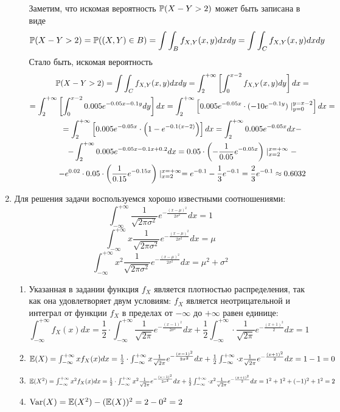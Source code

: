 \documentclass[12pt, a4paper]{article}\usepackage[]{graphicx}\usepackage[]{color}
\begin{document}
\begin{enumerate}
\begin{enumerate}
	Заметим, что искомая вероятность  $\P(X-Y > 2)$ может быть записана в виде
	\[
	\P(X-Y > 2) = \P((X, Y) \in B ) = \int \int_B f_{X, Y} (x, y) dx dy = \int \int_C f_{X, Y} (x, y) dx dy
	\]
	Стало быть, искомая вероятность
	\begin{multline*}
	\P(X-Y > 2) = \int \int_C f_{X, Y} (x, y) dx dy = \int_{2}^{+\infty} \left[ \int_{0}^{x-2} f_{X, Y} (x, y) dy \right] dx =\\
	= \int_{2}^{+\infty} \left[ \int_{0}^{x-2} 0.005e^{-0.05x-0.1y}dy \right] dx
	= \int_{2}^{+\infty} \left[ 0.005e^{-0.05x} \cdot (-10e^{-0.1y}) \mid_{y=0}^{y=x-2} \right] dx = \\
	=  \int_{2}^{+\infty} \left[ 0.005e^{-0.05x} \cdot\left(1-e^{-0.1(x-2)}  \right) \right] dx  = \int_{2}^{+\infty} 0.005e^{-0.05x} dx - \\
	- \int_{2}^{+\infty} 0.005e^{-0.05x-0.1x+0.2} dx
	= 0.05 \cdot \left( -\frac{1}{0.05}e^{-0.05x}  \right) \mid_{x=2}^{x=+\infty} - \\
	- e^{0.02} \cdot 0.05 \cdot \left( \frac{1}{0.15} e^{-0.15x} \right)\mid_{x=2}^{x=+\infty}
	= e^{-0.1} -\frac{1}{3} e^{-0.1} = \frac{2}{3}e^{-0.1}  \approx 0.6032
	\end{multline*}
\end{enumerate}
\item Для решения задачи воспользуемся хорошо известными соотношениями:
\[
\int_{-\infty}^{+\infty} \frac{1}{\sqrt{2\pi\sigma^2}} e^{-\frac{(x-\mu)^2}{2\sigma^2}} dx = 1
\]
\[
\int_{-\infty}^{+\infty} x\frac{1}{\sqrt{2\pi\sigma^2}} e^{-\frac{(x-\mu)^2}{2\sigma^2}} dx = \mu
\]
\[
\int_{-\infty}^{+\infty} x^2 \frac{1}{\sqrt{2\pi\sigma^2}} e^{-\frac{(x-\mu)^2}{2\sigma^2}} dx = \mu^2 + \sigma^2
\]
\begin{enumerate}
	\item Указанная в задании функция $f_X$ является плотностью распределения, так как она удовлетворяет двум условиям:  $f_X$ является неотрицательной и интеграл от функции $f_X$ в пределах от  $-\infty$ до $+\infty$ равен единице:
	\[
	\int_{-\infty}^{+\infty} f_X (x) dx = \frac{1}{2} \cdot \int_{-\infty}^{+\infty}  \frac{1}{\sqrt{2\pi}} e^{-\frac{(x-1)^2}{2\sigma^2}} dx  + \frac{1}{2} \int_{-\infty}^{+\infty} \cdot \frac{1}{\sqrt{2\pi}} e^{-\frac{(x+1)^2}{2}} dx = 1
	\]
	\item $\E(X) =\int_{-\infty}^{+\infty} xf_X (x) dx =  \frac{1}{2} \cdot \int_{-\infty}^{+\infty} x \frac{1}{\sqrt{2\pi}} e^{-\frac{(x-1)^2}{2\sigma^2}} dx  + \frac{1}{2}\int_{-\infty}^{+\infty} \cdot x \frac{1}{\sqrt{2\pi}} e^{-\frac{(x+1)^2}{2}} dx = 1- 1=  0$
	\item $\E(X^2) = \int_{-\infty}^{+\infty} x^2 f_X (x) dx  =  \frac{1}{2} \cdot \int_{-\infty}^{+\infty} x^2 \frac{1}{\sqrt{2\pi}} e^{-\frac{(x-1)^2}{2\sigma^2}} dx  + \frac{1}{2} \int_{-\infty}^{+\infty}\cdot x^2 \frac{1}{\sqrt{2\pi}} e^{-\frac{(x+1)^2}{2}} dx = 1^2 + 1^2 + (-1)^2 + 1^2 =  2$
	\item $\Var(X) = \E(X^2) - (\E(X))^2 = 2 - 0^2 = 2$
\end{enumerate}
\end{enumerate}
\end{document}

